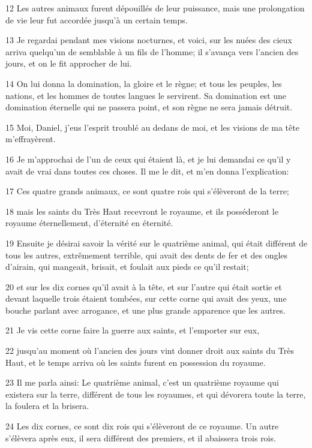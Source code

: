 \par 12 Les autres animaux furent dépouillés de leur puissance, mais une prolongation de vie leur fut accordée jusqu'à un certain temps.
\par 13 Je regardai pendant mes visions nocturnes, et voici, sur les nuées des cieux arriva quelqu'un de semblable à un fils de l'homme; il s'avança vers l'ancien des jours, et on le fit approcher de lui.
\par 14 On lui donna la domination, la gloire et le règne; et tous les peuples, les nations, et les hommes de toutes langues le servirent. Sa domination est une domination éternelle qui ne passera point, et son règne ne sera jamais détruit.
\par 15 Moi, Daniel, j'eus l'esprit troublé au dedans de moi, et les visions de ma tête m'effrayèrent.
\par 16 Je m'approchai de l'un de ceux qui étaient là, et je lui demandai ce qu'il y avait de vrai dans toutes ces choses. Il me le dit, et m'en donna l'explication:
\par 17 Ces quatre grands animaux, ce sont quatre rois qui s'élèveront de la terre;
\par 18 mais les saints du Très Haut recevront le royaume, et ils posséderont le royaume éternellement, d'éternité en éternité.
\par 19 Ensuite je désirai savoir la vérité sur le quatrième animal, qui était différent de tous les autres, extrêmement terrible, qui avait des dents de fer et des ongles d'airain, qui mangeait, brisait, et foulait aux pieds ce qu'il restait;
\par 20 et sur les dix cornes qu'il avait à la tête, et sur l'autre qui était sortie et devant laquelle trois étaient tombées, sur cette corne qui avait des yeux, une bouche parlant avec arrogance, et une plus grande apparence que les autres.
\par 21 Je vis cette corne faire la guerre aux saints, et l'emporter sur eux,
\par 22 jusqu'au moment où l'ancien des jours vint donner droit aux saints du Très Haut, et le temps arriva où les saints furent en possession du royaume.
\par 23 Il me parla ainsi: Le quatrième animal, c'est un quatrième royaume qui existera sur la terre, différent de tous les royaumes, et qui dévorera toute la terre, la foulera et la brisera.
\par 24 Les dix cornes, ce sont dix rois qui s'élèveront de ce royaume. Un autre s'élèvera après eux, il sera différent des premiers, et il abaissera trois rois.
